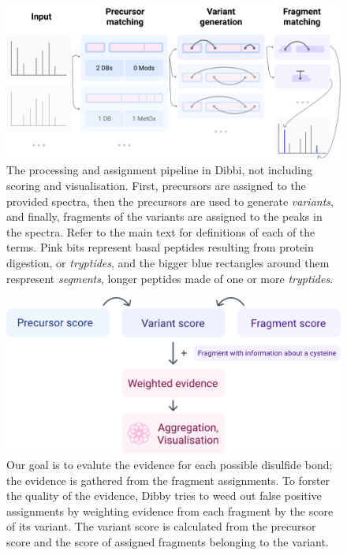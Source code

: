 \begin{figure}
	\centering
	\includegraphics[width=\linewidth]{img/pipeline.pdf}
	\caption{The processing and assignment pipeline in Dibbi, not including scoring and visualisation. First, precursors are assigned to the provided spectra, then the precursors are used to generate \emph{variants}, and finally, fragments of the variants are assigned to the peaks in the spectra. Refer to the main text for definitions of each of the terms. Pink bits represent basal peptides resulting from protein digestion, or \emph{tryptides}, and the bigger blue rectangles around them respresent \emph{segments}, longer peptides made of one or more \emph{tryptides}.}\label{fig:pipeline}

\end{figure}

\begin{figure}
	\centering
	\includegraphics[width=0.75\linewidth]{img/score-calculation.pdf}
	\caption{Our goal is to evalute the evidence for each possible disulfide bond; the evidence is gathered from the fragment assignments. To forster the quality of the evidence, Dibby tries to weed out false positive assignments by weighting evidence from each fragment by the score of its variant. The variant score is calculated from the precursor score and the score of assigned fragments belonging to the variant.}\label{fig:score-calculation}
\end{figure}


